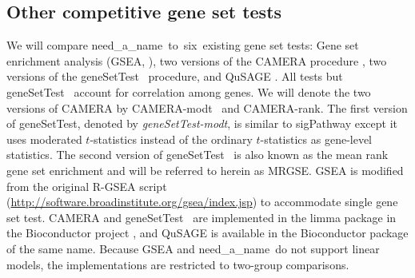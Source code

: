 \documentclass[useAMS,usenatbib, galley]{biom}
\newcommand{\OurMethod}{need\_a\_name}
\newcommand{\HowmanyTest}{six}
\newcommand{\CMR}{CAMERA-rank}
\newcommand{\CMT}{CAMERA-modt}
\newcommand{\gent}{geneSetTest-modt}
\newcommand{\gen}{geneSetTest}
\begin{document}
	\subsection{Other competitive gene set tests}
	We will compare \OurMethod~to~\HowmanyTest~existing gene set tests: Gene set enrichment analysis (GSEA, \cite{subramanian2005gene}), two versions of the CAMERA procedure \citep{wu2012camera}, two versions of the \gen~ procedure, and QuSAGE \citep{yaari2013quantitative}. All tests but \gen~ account for correlation among genes. We will denote the two versions of CAMERA by \CMT~ and \CMR. The first version of \gen, denoted by \textit{\gent}, is similar to sigPathway \citep{tian2005discovering} except it uses moderated $t$-statistics instead of the ordinary $t$-statistics as gene-level statistics. The second version of \gen~ is also known as the mean rank gene set enrichment \citep{michaud2008integrative} and will be referred to herein as MRGSE. GSEA is modified from the original R-GSEA script (\url{http://software.broadinstitute.org/gsea/index.jsp}) to accommodate single gene set test. CAMERA and \gen~ are implemented  in the limma package \citep{smyth2005limma} in the Bioconductor project \citep{gentleman2004bioconductor}, and QuSAGE is available in the Bioconductor package of the same name. Because GSEA and \OurMethod~do not support linear models, the implementations are restricted to two-group comparisons.
	
\end{document}
